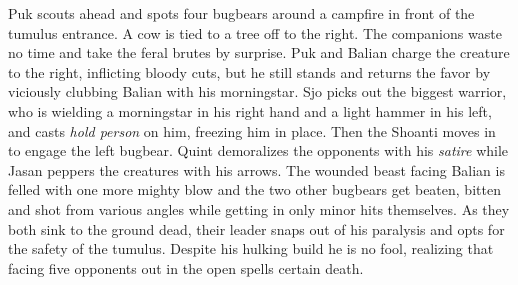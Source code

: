 Puk scouts ahead and spots four bugbears around a campfire in front of the tumulus entrance. A cow is tied to a tree off to the right. The companions waste no time and take the feral brutes by surprise. Puk and Balian charge the creature to the right, inflicting bloody cuts, but he still stands and returns the favor by viciously clubbing Balian with his morningstar. Sjo picks out the biggest warrior, who is wielding a morningstar in his right hand and a light hammer in his left, and casts {\itshape hold person} on him, freezing him in place. Then the Shoanti moves in to engage the left bugbear. Quint demoralizes the opponents with his  {\itshape satire} while Jasan peppers the creatures with his arrows. The wounded beast facing Balian is felled with one more mighty blow and the two other bugbears get beaten, bitten and shot from various angles while getting in only minor hits themselves. As they both sink to the ground dead, their leader snaps out of his paralysis and opts for the safety of the tumulus. Despite his hulking build he is no fool, realizing that facing five opponents out in the open spells certain death. 